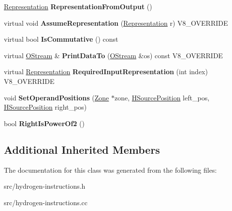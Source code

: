 \begin{DoxyCompactItemize}
\item 
\hypertarget{classv8_1_1internal_1_1_h_binary_operation_aa9a29577fcf2d692c1c4be97e40a7436}{}\hyperlink{classv8_1_1internal_1_1_representation}{Representation} {\bfseries Representation\+From\+Output} ()\label{classv8_1_1internal_1_1_h_binary_operation_aa9a29577fcf2d692c1c4be97e40a7436}

\item 
\hypertarget{classv8_1_1internal_1_1_h_binary_operation_a91413e84f51c5c4af40821bbc3bbebbd}{}virtual void {\bfseries Assume\+Representation} (\hyperlink{classv8_1_1internal_1_1_representation}{Representation} r) V8\+\_\+\+O\+V\+E\+R\+R\+I\+D\+E\label{classv8_1_1internal_1_1_h_binary_operation_a91413e84f51c5c4af40821bbc3bbebbd}

\item 
\hypertarget{classv8_1_1internal_1_1_h_binary_operation_a7f40569aadfc98cb47ee646b4b736c4a}{}virtual bool {\bfseries Is\+Commutative} () const \label{classv8_1_1internal_1_1_h_binary_operation_a7f40569aadfc98cb47ee646b4b736c4a}

\item 
\hypertarget{classv8_1_1internal_1_1_h_binary_operation_a0e652927c9f1d864aedf952443c298ca}{}virtual \hyperlink{classv8_1_1internal_1_1_o_stream}{O\+Stream} \& {\bfseries Print\+Data\+To} (\hyperlink{classv8_1_1internal_1_1_o_stream}{O\+Stream} \&os) const V8\+\_\+\+O\+V\+E\+R\+R\+I\+D\+E\label{classv8_1_1internal_1_1_h_binary_operation_a0e652927c9f1d864aedf952443c298ca}

\item 
\hypertarget{classv8_1_1internal_1_1_h_binary_operation_aabdc2d41a17dbbf7f27f69b41c87893a}{}virtual \hyperlink{classv8_1_1internal_1_1_representation}{Representation} {\bfseries Required\+Input\+Representation} (int index) V8\+\_\+\+O\+V\+E\+R\+R\+I\+D\+E\label{classv8_1_1internal_1_1_h_binary_operation_aabdc2d41a17dbbf7f27f69b41c87893a}

\item 
\hypertarget{classv8_1_1internal_1_1_h_binary_operation_ad0c76c2e1b3b2b153be4dff41dd696ed}{}void {\bfseries Set\+Operand\+Positions} (\hyperlink{classv8_1_1internal_1_1_zone}{Zone} $\ast$zone, \hyperlink{classv8_1_1internal_1_1_h_source_position}{H\+Source\+Position} left\+\_\+pos, \hyperlink{classv8_1_1internal_1_1_h_source_position}{H\+Source\+Position} right\+\_\+pos)\label{classv8_1_1internal_1_1_h_binary_operation_ad0c76c2e1b3b2b153be4dff41dd696ed}

\item 
\hypertarget{classv8_1_1internal_1_1_h_binary_operation_ac367945e526aaac0e06b4dcef728a5c2}{}bool {\bfseries Right\+Is\+Power\+Of2} ()\label{classv8_1_1internal_1_1_h_binary_operation_ac367945e526aaac0e06b4dcef728a5c2}

\end{DoxyCompactItemize}
\subsection*{Additional Inherited Members}


The documentation for this class was generated from the following files\+:\begin{DoxyCompactItemize}
\item 
src/hydrogen-\/instructions.\+h\item 
src/hydrogen-\/instructions.\+cc\end{DoxyCompactItemize}
